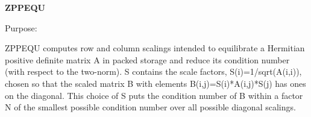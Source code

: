 {\bfseries Z\+P\+P\+E\+Q\+U} 

 \begin{DoxyParagraph}{Purpose\+: }
\begin{DoxyVerb} ZPPEQU computes row and column scalings intended to equilibrate a
 Hermitian positive definite matrix A in packed storage and reduce
 its condition number (with respect to the two-norm).  S contains the
 scale factors, S(i)=1/sqrt(A(i,i)), chosen so that the scaled matrix
 B with elements B(i,j)=S(i)*A(i,j)*S(j) has ones on the diagonal.
 This choice of S puts the condition number of B within a factor N of
 the smallest possible condition number over all possible diagonal
 scalings.\end{DoxyVerb}
 
\end{DoxyParagraph}


